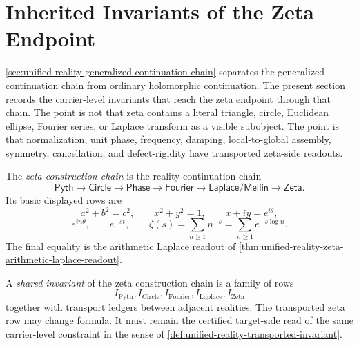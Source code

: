 \section{Inherited Invariants of the Zeta Endpoint}
\label{sec:unified-reality-zeta-inherited-invariants}

\autoref{sec:unified-reality-generalized-continuation-chain} separates
the generalized continuation chain from ordinary holomorphic
continuation. The present section records the carrier-level invariants
that reach the zeta endpoint through that chain. The point is not that
zeta contains a literal triangle, circle, Euclidean ellipse, Fourier
series, or Laplace transform as a visible subobject. The point is that
normalization, unit phase, frequency, damping, local-to-global assembly,
symmetry, cancellation, and defect-rigidity have transported zeta-side
readouts.

\begin{definition}
\label{def:unified-reality-zeta-construction-chain}
The \emph{zeta construction chain} is the reality-continuation chain
$$
\mathsf{Pyth}
\to
\mathsf{Circle}
\to
\mathsf{Phase}
\to
\mathsf{Fourier}
\to
\mathsf{Laplace/Mellin}
\to
\mathsf{Zeta}.
$$
Its basic displayed rows are
$$
a^2+b^2=c^2,
\qquad
x^2+y^2=1,
\qquad
x+iy=e^{i\theta},
$$
$$
e^{in\theta},
\qquad
e^{-st},
\qquad
\zeta(s)=\sum_{n\ge1}n^{-s}
=\sum_{n\ge1}e^{-s\log n}.
$$
The final equality is the arithmetic Laplace readout of
\autoref{thm:unified-reality-zeta-arithmetic-laplace-readout}.
\end{definition}

\begin{definition}
\label{def:unified-reality-zeta-chain-shared-invariant}
A \emph{shared invariant} of the zeta construction chain is a family of
rows
$$
I_{\mathrm{Pyth}},
I_{\mathrm{Circle}},
I_{\mathrm{Fourier}},
I_{\mathrm{Laplace}},
I_{\mathrm{Zeta}}
$$
together with transport ledgers between adjacent realities. The
transported zeta row may change formula. It must remain the certified
target-side read of the same carrier-level constraint in the sense of
\autoref{def:unified-reality-transported-invariant}.
\end{definition}


